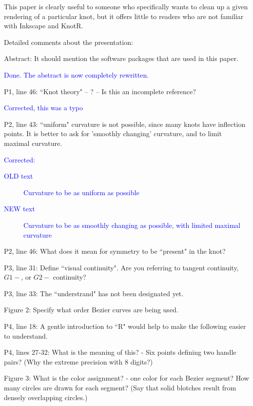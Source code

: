 \documentclass[12pt]{article}
\begin{document}
This paper is clearly useful to someone who specifically wants to
clean up a given rendering of a particular knot, but it offers little
to readers who are not familiar with Inkscape and KnotR.

Detailed comments about the presentation:

Abstract: It should mention the software packages that are used in
this paper.

\textcolor{blue}{Done.  The abstract is now completely rewritten.}

P1, line 46:  ``Knot theory" -- ?  -- Is this an incomplete reference?

\textcolor{blue}{Corrected, this was a typo}

P2, line 43: ``uniform" curvature is not possible, since many knots
have inflection points.  It is better to ask for 'smoothly changing'
curvature, and to limit maximal curvature.

\textcolor{blue}{Corrected:
  \begin{description}
  \item[OLD text] Curvature to be as uniform as possible
\item[NEW text] Curvature to be as smoothly changing as possible, with
  limited maximal curvature
  \end{description}
}
  


P2, line 46: What does it mean for symmetry to be ``present" in the
knot?

P3, line 31: Define ``visual continuity".  Are you referring to tangent
continuity, $G1-$, or $G2-$ continuity?

P3, line 33:  The ``understrand" has not been designated yet.

Figure 2:  Specify what order Bezier curves are being used.

P4, line 18: A gentle introduction to ``R" would help to make the
following easier to understand.

P4, lines 27-32: What is the meaning of this? - Six points defining
two handle pairs?  (Why the extreme precision with 8 digits?)

Figure 3: What is the color assignment? - one color for each Bezier
segment?  How many circles are drawn for each segment?  (Say that
solid blotches result from densely overlapping circles.)
\end{document}
